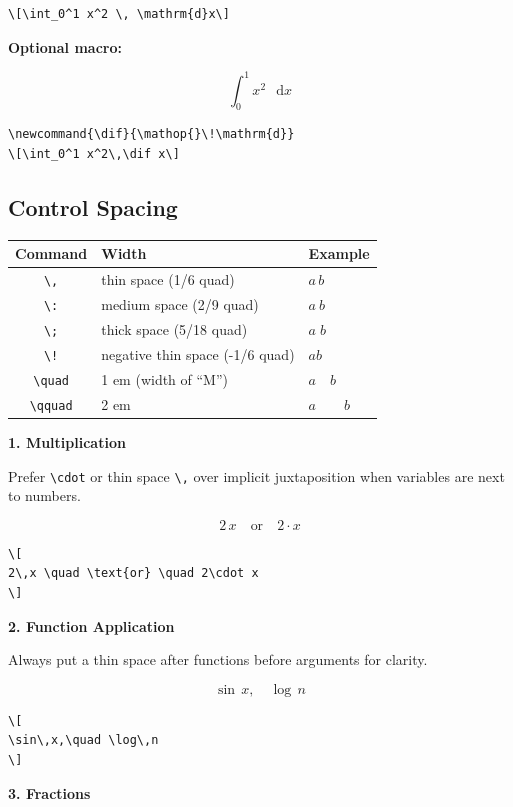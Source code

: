 \documentclass[12pt,a4paper]{article}
\newcommand{\dif}{\mathop{}\!\mathrm{d}}
\begin{document}
\begin{verbatim}
\[\int_0^1 x^2 \, \mathrm{d}x\]
\end{verbatim}

\textbf{Optional macro:}

\[
\int_0^1 x^2\,\dif x
\]

\begin{verbatim}
\newcommand{\dif}{\mathop{}\!\mathrm{d}}
\[\int_0^1 x^2\,\dif x\]
\end{verbatim}

\subsection{Control Spacing}

\begin{center}
\begin{tabular}{c l l}
\toprule
Command & Width & Example \\
\midrule
\verb|\,| & thin space (1/6 quad) & $a\,b$ \\
\verb|\:| & medium space (2/9 quad) & $a\:b$ \\
\verb|\;| & thick space (5/18 quad) & $a\;b$ \\
\verb|\!| & negative thin space (-1/6 quad) & $a\!b$ \\
\verb|\quad| & 1 em (width of ``M'') & $a\quad b$ \\
\verb|\qquad| & 2 em & $a\qquad b$ \\
\bottomrule
\end{tabular}
\end{center}

\textbf{1. Multiplication}

Prefer \verb|\cdot| or thin space \verb|\,| over implicit juxtaposition when variables are next to numbers.

\[
2\,x \quad \text{or} \quad 2\cdot x
\]

\begin{verbatim}
\[
2\,x \quad \text{or} \quad 2\cdot x
\]
\end{verbatim}

\textbf{2. Function Application}

Always put a thin space after functions before arguments for clarity.

\[
\sin\,x,\quad \log\,n
\]

\begin{verbatim}
\[
\sin\,x,\quad \log\,n
\]
\end{verbatim}

\textbf{3. Fractions}
\end{document}
